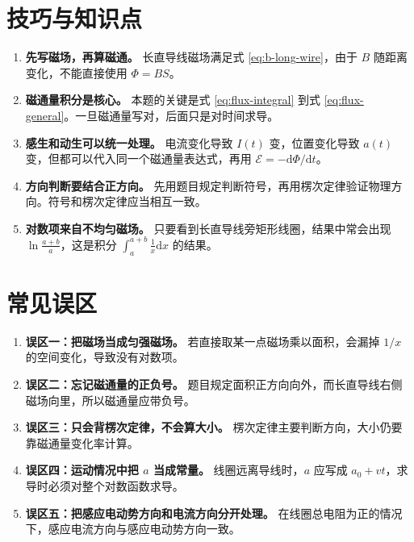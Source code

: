 \documentclass[11pt,a4paper,fontset=fandol]{ctexart}
\newcommand{\dd}{\mathrm{d}}
\newcommand{\emf}{\mathcal{E}}
\begin{document}
\section*{技巧与知识点}
\begin{tipBox}
\begin{enumerate}
 \item \textbf{先写磁场，再算磁通。} 长直导线磁场满足式 \eqref{eq:b-long-wire}，由于 $B$ 随距离变化，不能直接使用 $\Phi=BS$。
 \item \textbf{磁通量积分是核心。} 本题的关键是式 \eqref{eq:flux-integral} 到式 \eqref{eq:flux-general}。一旦磁通量写对，后面只是对时间求导。
 \item \textbf{感生和动生可以统一处理。} 电流变化导致 $I(t)$ 变，位置变化导致 $a(t)$ 变，但都可以代入同一个磁通量表达式，再用 $\emf=-\dd\Phi/\dd t$。
 \item \textbf{方向判断要结合正方向。} 先用题目规定判断符号，再用楞次定律验证物理方向。符号和楞次定律应当相互一致。
 \item \textbf{对数项来自不均匀磁场。} 只要看到长直导线旁矩形线圈，结果中常会出现 $\ln\frac{a+b}{a}$，这是积分 $\int_a^{a+b}\frac{1}{x}\dd x$ 的结果。
\end{enumerate}
\end{tipBox}

\section*{常见误区}
\begin{warnBox}
\begin{enumerate}
 \item \textbf{误区一：把磁场当成匀强磁场。} 若直接取某一点磁场乘以面积，会漏掉 $1/x$ 的空间变化，导致没有对数项。
 \item \textbf{误区二：忘记磁通量的正负号。} 题目规定面积正方向向外，而长直导线右侧磁场向里，所以磁通量应带负号。
 \item \textbf{误区三：只会背楞次定律，不会算大小。} 楞次定律主要判断方向，大小仍要靠磁通量变化率计算。
 \item \textbf{误区四：运动情况中把 $a$ 当成常量。} 线圈远离导线时，$a$ 应写成 $a_0+vt$，求导时必须对整个对数函数求导。
 \item \textbf{误区五：把感应电动势方向和电流方向分开处理。} 在线圈总电阻为正的情况下，感应电流方向与感应电动势方向一致。
\end{enumerate}
\end{warnBox}
\end{document}

